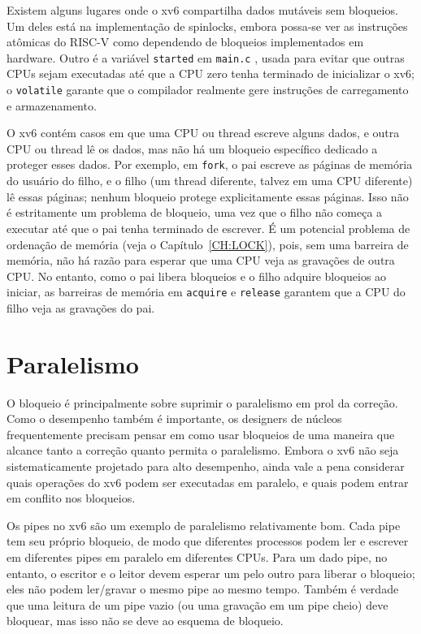 Existem alguns lugares onde o xv6 compartilha dados mutáveis sem bloqueios. Um deles está na implementação de spinlocks, embora possa-se ver as instruções atômicas do RISC-V como dependendo de 
bloqueios implementados em hardware. Outro é a variável {\tt started} em {\tt main.c} , usada para evitar que outras CPUs sejam executadas até que a CPU zero 
tenha terminado de inicializar o xv6; o {\tt volatile} garante que o compilador realmente gere instruções de carregamento e armazenamento.

O xv6 contém casos em que uma CPU ou thread escreve alguns dados, e outra CPU ou thread lê os dados, mas não há um bloqueio específico dedicado a proteger esses dados. Por exemplo, em {\tt fork}, o 
pai escreve as páginas de memória do usuário do filho, e o filho (um thread diferente, talvez em uma CPU diferente) lê essas páginas; nenhum bloqueio protege explicitamente essas páginas. Isso não 
é estritamente um problema de bloqueio, uma vez que o filho não começa a executar até que o pai tenha terminado de escrever. É um potencial problema de ordenação de memória (veja o 
Capítulo~\ref{CH:LOCK}), pois, sem uma barreira de memória, não há razão para esperar que uma CPU veja as gravações de outra CPU. No entanto, como o pai libera bloqueios e o filho adquire bloqueios 
ao iniciar, as barreiras de memória em {\tt acquire} e {\tt release} garantem que a CPU do filho veja as gravações do pai.

\section{Paralelismo}

O bloqueio é principalmente sobre suprimir o paralelismo em prol da
correção. Como o desempenho também é importante, os designers de núcleos
frequentemente precisam pensar em como usar bloqueios de uma maneira que
alcance tanto a correção quanto permita o paralelismo. Embora o xv6
não seja sistematicamente projetado para alto desempenho, ainda vale a pena
considerar quais operações do xv6 podem ser executadas em paralelo, e quais
podem entrar em conflito nos bloqueios.

Os pipes no xv6 são um exemplo de paralelismo relativamente bom. Cada pipe tem
seu próprio bloqueio, de modo que diferentes processos podem ler e escrever
em diferentes pipes em paralelo em diferentes CPUs. Para um dado pipe,
no entanto, o escritor e o leitor devem esperar um pelo outro para liberar o
bloqueio; eles não podem ler/gravar o mesmo pipe ao mesmo tempo. Também é
verdade que uma leitura de um pipe vazio (ou uma gravação em um pipe cheio)
deve bloquear, mas isso não se deve ao esquema de bloqueio.


